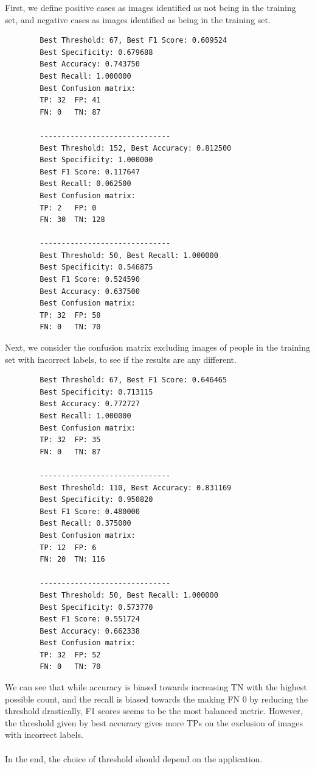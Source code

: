 \documentclass{article}
\begin{document}
\newpage
First, we define positive cases as images identified as not being in the training set, and negative cases as images identified as being in the training set.
\begin{tcolorbox}[title={Normal Confusion Matrix}]
    \begin{lstlisting}
        Best Threshold: 67, Best F1 Score: 0.609524
        Best Specificity: 0.679688
        Best Accuracy: 0.743750
        Best Recall: 1.000000
        Best Confusion matrix:
        TP: 32  FP: 41
        FN: 0   TN: 87

        ------------------------------
        Best Threshold: 152, Best Accuracy: 0.812500
        Best Specificity: 1.000000
        Best F1 Score: 0.117647
        Best Recall: 0.062500
        Best Confusion matrix:
        TP: 2   FP: 0
        FN: 30  TN: 128

        ------------------------------
        Best Threshold: 50, Best Recall: 1.000000
        Best Specificity: 0.546875
        Best F1 Score: 0.524590
        Best Accuracy: 0.637500
        Best Confusion matrix:
        TP: 32  FP: 58
        FN: 0   TN: 70
    \end{lstlisting}
\end{tcolorbox}
\newpage
Next, we consider the confusion matrix excluding images of people in the training set with incorrect labels, to see if the results are any different.
\begin{tcolorbox}[title={Confusion Matrix (excluding images with incorrect labels)}]
    \begin{lstlisting}
        Best Threshold: 67, Best F1 Score: 0.646465
        Best Specificity: 0.713115
        Best Accuracy: 0.772727
        Best Recall: 1.000000
        Best Confusion matrix:
        TP: 32  FP: 35
        FN: 0   TN: 87

        ------------------------------
        Best Threshold: 110, Best Accuracy: 0.831169
        Best Specificity: 0.950820
        Best F1 Score: 0.480000
        Best Recall: 0.375000
        Best Confusion matrix:
        TP: 12  FP: 6
        FN: 20  TN: 116

        ------------------------------
        Best Threshold: 50, Best Recall: 1.000000
        Best Specificity: 0.573770
        Best F1 Score: 0.551724
        Best Accuracy: 0.662338
        Best Confusion matrix:
        TP: 32  FP: 52
        FN: 0   TN: 70
    \end{lstlisting}
\end{tcolorbox}

We can see that while accuracy is biased towards increasing TN with the highest possible count, and the recall is biased towards the making FN 0 by reducing the threshold drastically, F1 scores seems to be the most balanced metric. However, the threshold given by best accuracy gives more TPs on the exclusion of images with incorrect labels.
\\
\\
In the end, the choice of threshold should depend on the application.
\end{document}
